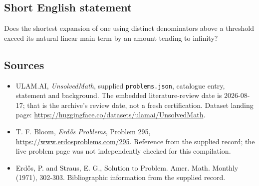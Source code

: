 \documentclass[11pt,a4paper]{article}
\begin{document}
\subsection{Short English statement}

Does the shortest expansion of one using distinct denominators above a threshold exceed its natural linear main term by an amount tending to infinity?

\subsection{Sources}

{\small

\begin{itemize}

\item[\hypertarget{source:statement:1}{S1}] ULAM.AI, \emph{UnsolvedMath}, supplied \texttt{problems.json}, catalogue entry, statement and background. The embedded literature-review date is 2026-08-17; that is the archive’s review date, not a fresh certification. Dataset landing page: \url{https://huggingface.co/datasets/ulamai/UnsolvedMath}.

\item[\hypertarget{source:statement:2}{S2}] T. F. Bloom, \emph{Erdős Problems}, Problem 295, \url{https://www.erdosproblems.com/295}. Reference from the supplied record; the live problem page was not independently checked for this compilation.

\item[\hypertarget{source:statement:3}{S3}] Erd\H{o}s, P. and Straus, E. G., Solution to Problem. Amer. Math. Monthly (1971), 302-303. Bibliographic information from the supplied record.

\end{itemize}

}

\label{end:statement}
\end{document}
